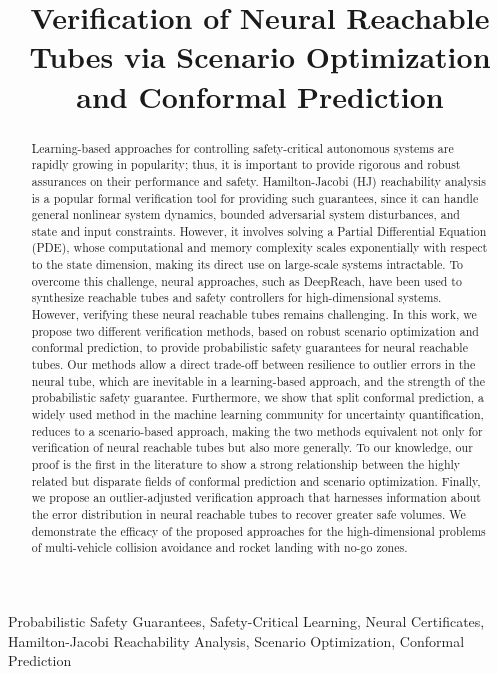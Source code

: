\documentclass{l4dc2024}
\title[Verification of Neural Reachable Tubes]{Verification of Neural Reachable Tubes via Scenario Optimization and Conformal Prediction}
\begin{document}
\maketitle

\begin{abstract}%
 Learning-based approaches for controlling safety-critical autonomous systems are rapidly growing in popularity; thus, it is important to provide rigorous and robust assurances on their performance and safety.
 Hamilton-Jacobi (HJ) reachability analysis is a popular formal verification tool for providing such guarantees, since it can handle general nonlinear system dynamics, bounded adversarial system disturbances, and state and input constraints.
 However, it involves solving a Partial Differential Equation (PDE), whose computational and memory complexity scales exponentially with respect to the state dimension, making its direct use on large-scale systems intractable.
 To overcome this challenge, neural approaches, such as DeepReach, have been used to synthesize reachable tubes and safety controllers for high-dimensional systems.
 However, verifying these neural reachable tubes remains challenging.
 In this work, we propose two different verification methods, based on robust scenario optimization and conformal prediction, to provide probabilistic safety guarantees for neural reachable tubes.
 Our methods allow a direct trade-off between resilience to outlier errors in the neural tube, which are inevitable in a learning-based approach, and the strength of the probabilistic safety guarantee.
 Furthermore, we show that split conformal prediction, a widely used method in the machine learning community for uncertainty quantification, reduces to a scenario-based approach, making the two methods equivalent not only for verification of neural reachable tubes but also more generally.
 To our knowledge, our proof is the first in the literature to show a strong relationship between the highly related but disparate fields of conformal prediction and scenario optimization.
 Finally, we propose an outlier-adjusted verification approach that harnesses information about the error distribution in neural reachable tubes to recover greater safe volumes.
 We demonstrate the efficacy of the proposed approaches for the high-dimensional problems of multi-vehicle collision avoidance and rocket landing with no-go zones.%
\end{abstract}

\begin{keywords}%
  Probabilistic Safety Guarantees, Safety-Critical Learning, Neural Certificates, Hamilton-Jacobi Reachability Analysis, Scenario Optimization, Conformal Prediction%
\end{keywords}
\end{document}
